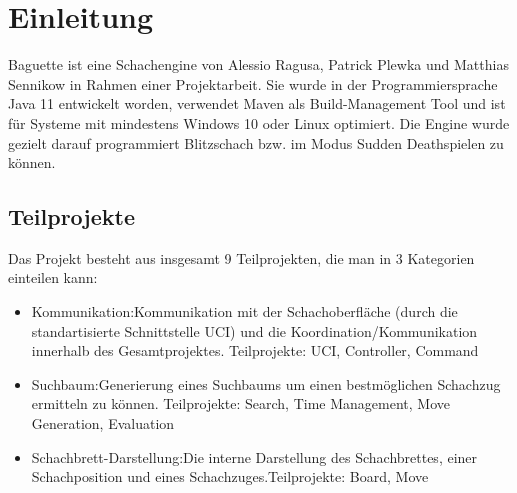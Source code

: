 \section{Einleitung}
Baguette ist eine Schachengine von Alessio Ragusa, Patrick Plewka und Matthias Sennikow in Rahmen einer Projektarbeit.
Sie wurde in der Programmiersprache Java 11 entwickelt worden, verwendet Maven als Build-Management Tool und ist für Systeme mit mindestens Windows 10 oder Linux optimiert. \newline
Die Engine wurde gezielt darauf programmiert Blitzschach bzw. im Modus Sudden Death spielen zu k\"onnen.\newline
\subsection{Teilprojekte}
Das Projekt besteht aus insgesamt 9 Teilprojekten, die man in 3 Kategorien einteilen kann:
\begin{itemize}
    \item{Kommunikation:\newline Kommunikation mit der Schachoberfl\"ache (durch die standartisierte Schnittstelle UCI) und die Koordination/Kommunikation innerhalb des Gesamtprojektes.
        \newline Teilprojekte: UCI, Controller, Command}
    \item{Suchbaum:\newline Generierung eines Suchbaums um einen bestmöglichen Schachzug ermitteln zu können. \newline Teilprojekte:  Search, Time Management, Move Generation, Evaluation}
    \item{Schachbrett-Darstellung:\newline Die interne Darstellung des Schachbrettes, einer Schachposition und eines Schachzuges.\newline Teilprojekte: Board, Move}
\end{itemize}

